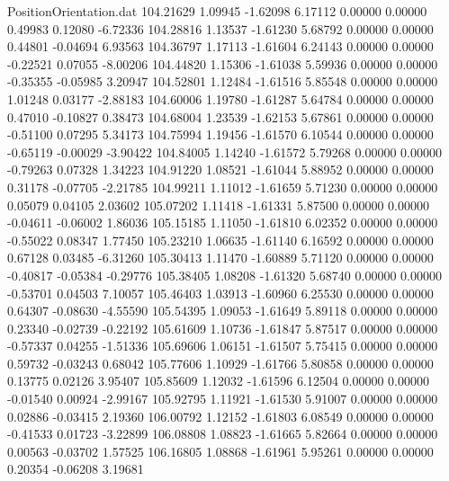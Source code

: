 \begin{filecontents}{PositionOrientation.dat}
 104.21629    1.09945   -1.62098     6.17112    0.00000    0.00000    0.49983    0.12080   -6.72336
 104.28816    1.13537   -1.61230     5.68792    0.00000    0.00000    0.44801   -0.04694    6.93563
 104.36797    1.17113   -1.61604     6.24143    0.00000    0.00000   -0.22521    0.07055   -8.00206
 104.44820    1.15306   -1.61038     5.59936    0.00000    0.00000   -0.35355   -0.05985    3.20947
 104.52801    1.12484   -1.61516     5.85548    0.00000    0.00000    1.01248    0.03177   -2.88183
 104.60006    1.19780   -1.61287     5.64784    0.00000    0.00000    0.47010   -0.10827    0.38473
 104.68004    1.23539   -1.62153     5.67861    0.00000    0.00000   -0.51100    0.07295    5.34173
 104.75994    1.19456   -1.61570     6.10544    0.00000    0.00000   -0.65119   -0.00029   -3.90422
 104.84005    1.14240   -1.61572     5.79268    0.00000    0.00000   -0.79263    0.07328    1.34223
 104.91220    1.08521   -1.61044     5.88952    0.00000    0.00000    0.31178   -0.07705   -2.21785
 104.99211    1.11012   -1.61659     5.71230    0.00000    0.00000    0.05079    0.04105    2.03602
 105.07202    1.11418   -1.61331     5.87500    0.00000    0.00000   -0.04611   -0.06002    1.86036
 105.15185    1.11050   -1.61810     6.02352    0.00000    0.00000   -0.55022    0.08347    1.77450
 105.23210    1.06635   -1.61140     6.16592    0.00000    0.00000    0.67128    0.03485   -6.31260
 105.30413    1.11470   -1.60889     5.71120    0.00000    0.00000   -0.40817   -0.05384   -0.29776
 105.38405    1.08208   -1.61320     5.68740    0.00000    0.00000   -0.53701    0.04503    7.10057
 105.46403    1.03913   -1.60960     6.25530    0.00000    0.00000    0.64307   -0.08630   -4.55590
 105.54395    1.09053   -1.61649     5.89118    0.00000    0.00000    0.23340   -0.02739   -0.22192
 105.61609    1.10736   -1.61847     5.87517    0.00000    0.00000   -0.57337    0.04255   -1.51336
 105.69606    1.06151   -1.61507     5.75415    0.00000    0.00000    0.59732   -0.03243    0.68042
 105.77606    1.10929   -1.61766     5.80858    0.00000    0.00000    0.13775    0.02126    3.95407
 105.85609    1.12032   -1.61596     6.12504    0.00000    0.00000   -0.01540    0.00924   -2.99167
 105.92795    1.11921   -1.61530     5.91007    0.00000    0.00000    0.02886   -0.03415    2.19360
 106.00792    1.12152   -1.61803     6.08549    0.00000    0.00000   -0.41533    0.01723   -3.22899
 106.08808    1.08823   -1.61665     5.82664    0.00000    0.00000    0.00563   -0.03702    1.57525
 106.16805    1.08868   -1.61961     5.95261    0.00000    0.00000    0.20354   -0.06208    3.19681

\end{filecontents}
